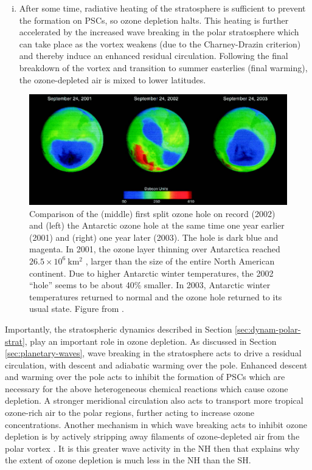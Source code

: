\begin{enumerate}[i.]
\item After some time, radiative heating of the stratosphere is sufficient to
  prevent the formation on PSCs, so ozone depletion halts. This heating is
  further accelerated by the increased wave breaking in the polar stratosphere
  which can take place as the vortex weakens (due to the Charney-Drazin
  criterion) and thereby induce an enhanced residual circulation. Following the
  final breakdown of the vortex and transition to summer easterlies (final
  warming), the ozone-depleted air is mixed to lower latitudes.
\end{enumerate}

\begin{figure}
 \centering
 \noindent\includegraphics[width=\textwidth]{figures/chapter-intro/2002_SSW.png}
 \caption[]{Comparison of the (middle) first split ozone hole on record (2002)
   and (left) the Antarctic ozone hole at the same time one year earlier (2001)
   and (right) one year later (2003). The hole is dark blue and magenta. In
   2001, the ozone layer thinning over Antarctica reached
   $26.5 \times 10^6~\mathrm{km^2}$ , larger than the size of the entire North
   American continent. Due to higher Antarctic winter temperatures, the 2002
   ``hole'' seems to be about 40\% smaller. In 2003, Antarctic winter
   temperatures returned to normal and the ozone hole returned to its usual
   state. Figure from \citet{Shepherd2005}.}
 \label{fig:2002_SSW}
\end{figure}

Importantly, the stratospheric dynamics described in Section
\ref{sec:dynam-polar-strat}, play an important role in ozone depletion. As
discussed in Section \ref{sec:planetary-waves}, wave breaking in the
stratosphere acts to drive a residual circulation, with descent and adiabatic
warming over the pole. Enhanced descent and warming over the pole acts to
inhibit the formation of PSCs which are necessary for the above heterogeneous
chemical reactions which cause ozone depletion. A stronger meridional
circulation also acts to transport more tropical ozone-rich air to the polar
regions, further acting to increase ozone concentrations. Another mechanism in
which wave breaking acts to inhibit ozone depletion is by actively stripping
away filaments of ozone-depleted air from the polar vortex \citep{Waugh1994}. It
is this greater wave activity in the NH then that explains why the extent of
ozone depletion is much less in the NH than the SH.

